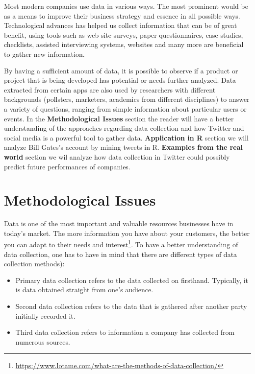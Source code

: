 Most modern companies use data in various ways. The most prominent would be as a means to improve their business strategy and essence in all possible ways. Technological advances has helped us collect information that can be of great benefit, using tools such as web site surveys, paper questionnaires, case studies, checklists, assisted interviewing systems, websites and many more are beneficial to gather new information.


By having a sufficient amount of data, it is possible to observe if a product or project that is being developed has potential or needs further analyzed.  Data extracted from certain apps are also used by researchers with different backgrounds (pollsters, marketers, academics from different disciplines) to answer a variety of questions, ranging from simple information about particular users or events.
In the \textbf{Methodological Issues} section the reader will have a better understanding of the approaches regarding data collection and how Twitter and social media is a powerful tool to gather data. \textbf{Application in R} section we will analyze Bill Gates's account by mining tweets in R. \textbf{Examples from the real world} section we wil analyze how data collection in Twitter could possibly predict future performances of companies.



\section{Methodological Issues}

Data is one of the most important and valuable resources businesses have in today’s market. The more information you have about your customers, the better you can adapt to their needs and interest\footnote{\href{https://www.lotame.com/what-are-the-methods-of-data-collection/}{https://www.lotame.com/what-are-the-methods-of-data-collection/}}. To have a better understanding of data collection, one has to have in mind that there are different types of data collection methods\citep{harrell2009data}):  

\begin{itemize}
	
	\item Primary data collection refers to the data collected on firsthand. Typically, it is data obtained straight from one’s audience.
	\item Second data collection refers to the data that is gathered after another party initially recorded it.
	\item Third data collection refers to information a company has collected from numerous sources.
	
\end{itemize}

